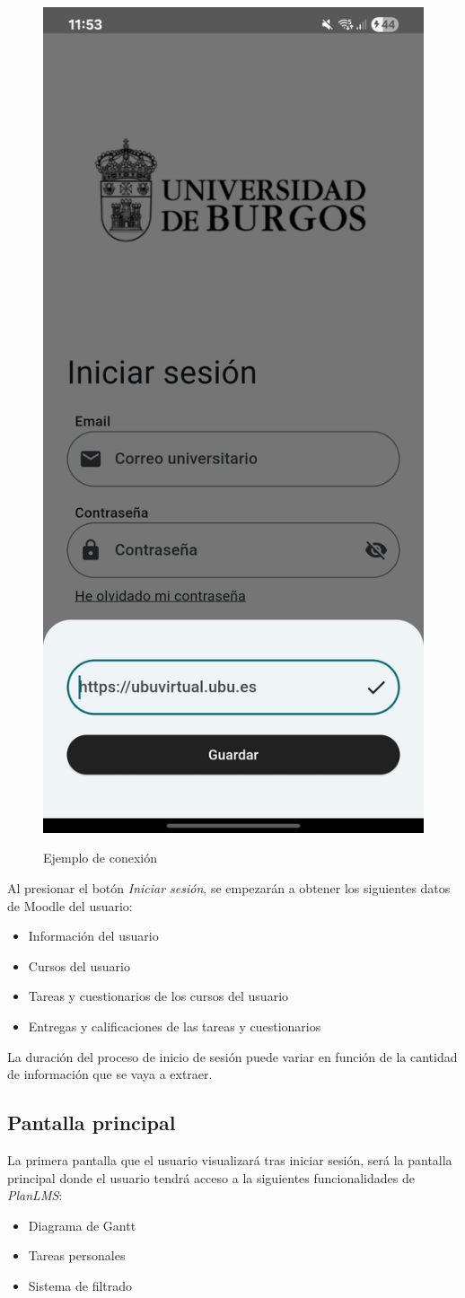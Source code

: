 \begin{figure}[H]
\begin{floatrow}
      {\includegraphics[width=0.5\linewidth]{img/conexion_ejemplo.jpg}}
      {\caption{Ejemplo de conexión}\label{fig:conexion_ejemplo}}
  \end{floatrow}
\end{figure}

Al presionar el botón \textit{Iniciar sesión}, se empezarán a obtener los siguientes datos de Moodle del usuario:
\begin{itemize}
    \item Información del usuario
    \item Cursos del usuario
    \item Tareas y cuestionarios de los cursos del usuario
   \item Entregas y calificaciones de las tareas y cuestionarios 
\end{itemize}
La duración del proceso de inicio de sesión puede variar en función de la cantidad de información que se vaya a extraer.

\subsection{Pantalla principal}
La primera pantalla que el usuario visualizará tras iniciar sesión, será la pantalla principal donde el usuario tendrá acceso a la siguientes funcionalidades de \textit{PlanLMS}:
\begin{itemize}
    \item Diagrama de Gantt
    \item Tareas personales
    \item Sistema de filtrado
\end{itemize}

